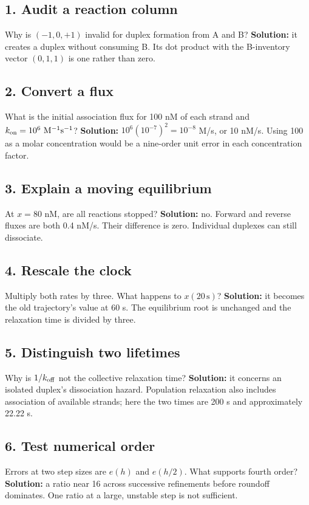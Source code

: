 \subsection*{1. Audit a reaction column}
Why is $(-1,0,+1)$ invalid for duplex formation from A and B?
\textbf{Solution:} it creates a duplex without consuming B. Its dot
product with the B-inventory vector $(0,1,1)$ is one rather than zero.

\subsection*{2. Convert a flux}
What is the initial association flux for 100 nM of each strand and
$k_{\rm on}=10^6\ \mathrm{M}^{-1}\mathrm{s}^{-1}$?
\textbf{Solution:} $10^6(10^{-7})^2=10^{-8}$ M/s, or 10 nM/s.
Using 100 as a molar concentration would be a nine-order unit error
in each concentration factor.

\subsection*{3. Explain a moving equilibrium}
At $x=80$ nM, are all reactions stopped?
\textbf{Solution:} no. Forward and reverse fluxes are both 0.4 nM/s.
Their difference is zero. Individual duplexes can still dissociate.

\subsection*{4. Rescale the clock}
Multiply both rates by three. What happens to $x(20\,\mathrm{s})$?
\textbf{Solution:} it becomes the old trajectory's value at 60 s.
The equilibrium root is unchanged and the relaxation time is divided by three.

\subsection*{5. Distinguish two lifetimes}
Why is $1/k_{\rm off}$ not the collective relaxation time?
\textbf{Solution:} it concerns an isolated duplex's dissociation hazard.
Population relaxation also includes association of available strands;
here the two times are 200 s and approximately 22.22 s.

\subsection*{6. Test numerical order}
Errors at two step sizes are $e(h)$ and $e(h/2)$. What supports fourth order?
\textbf{Solution:} a ratio near 16 across successive refinements before
roundoff dominates. One ratio at a large, unstable step is not sufficient.

